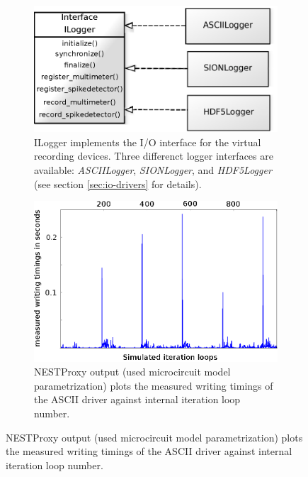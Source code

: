 \documentclass[]{YIC2015}
\begin{document}
\begin{figure}[tb]
\centering %
\begin{subfigure}[b]{0.49\textwidth}
                \includegraphics[width=.85\linewidth]{loggerinterface.eps}
                \caption{ILogger implements the I/O interface for the virtual
			recording devices.  Three differenct logger interfaces are
			available: \emph{ASCIILogger}, \emph{SIONLogger}, and
			\emph{HDF5Logger} (see section \ref{sec:io-drivers} for details). \cite{yuml}}
                \label{fig:loggerinterface}
        \end{subfigure}%
        \hspace{0.009\textwidth}
        \begin{subfigure}[b]{0.49\textwidth}
	      \includegraphics[width=.85\linewidth]{ascii_plot_10_8.eps}
	      \caption{NESTProxy output (used microcircuit model parametrization) plots the measured writing timings of the ASCII driver against internal iteration loop number.
	      \cite{yuml}}
	      \label{fig:asciiplot}
        \end{subfigure}%


\end{figure}

\end{document}
